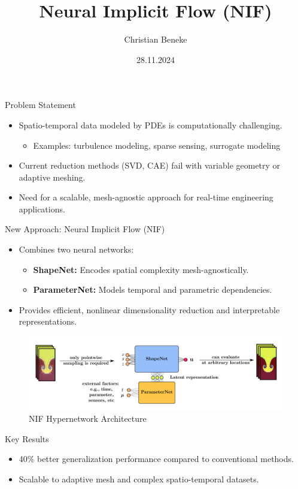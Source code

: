 \documentclass{beamer}
\title{Neural Implicit Flow (NIF)}
\author{Christian Beneke}
\date{28.11.2024}
\begin{document}
\frame{\titlepage}

\begin{frame}{Problem Statement}
\begin{itemize}
    \item Spatio-temporal data modeled by PDEs is computationally challenging.
    \begin{itemize}
        \item Examples: turbulence modeling, sparse sensing, surrogate modeling
    \end{itemize}
    \item Current reduction methods (SVD, CAE) fail with variable geometry or adaptive meshing.
    \item Need for a scalable, mesh-agnostic approach for real-time engineering applications.
\end{itemize}
\end{frame}

\begin{frame}{New Approach: Neural Implicit Flow (NIF)}
\begin{itemize}
    \item Combines two neural networks:
    \begin{itemize}
        \item \textbf{ShapeNet:} Encodes spatial complexity mesh-agnostically.
        \item \textbf{ParameterNet:} Models temporal and parametric dependencies.
    \end{itemize}
    \item Provides efficient, nonlinear dimensionality reduction and interpretable representations.
\end{itemize}
\begin{figure}
    \includegraphics[width=0.6\linewidth]{hypernetwork_diagram.png}
    \caption{NIF Hypernetwork Architecture}
\end{figure}
\end{frame}

\begin{frame}{Key Results}
\begin{itemize}
    \item 40\% better generalization performance compared to conventional methods.
    \item Scalable to adaptive mesh and complex spatio-temporal datasets.
\end{itemize}
\end{frame}
\end{document}
